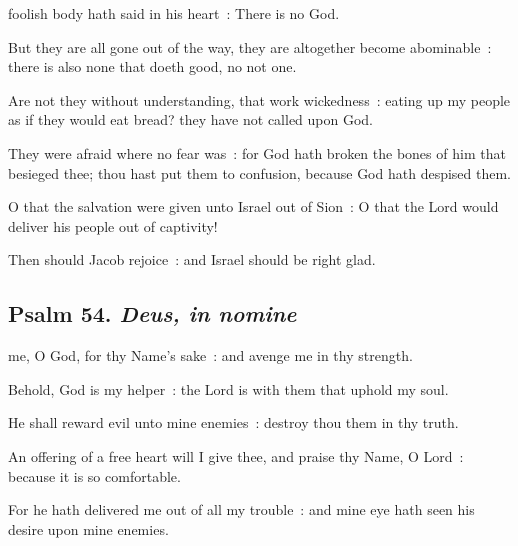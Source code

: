  foolish body hath said in his heart~: There is no God.\par
{}
But they are all gone out of the way, they are altogether become abominable~: there is also none that doeth good, no not one.\par
{}Are not they without understanding, that work wickedness~: eating up my people as if they would eat bread? they have not called upon God.\par
{}They were afraid where no fear was~: for God hath broken the bones of him that besieged thee; thou hast put them to confusion, because God hath despised them.\par
{}O that the salvation were given unto Israel out of Sion~: O that the Lord would deliver his people out of captivity!\par
{}Then should Jacob rejoice~: and Israel should be right glad.\par

\subsection{Psalm 54. \textit{Deus, in nomine}}


 me, O God, for thy Name's sake~: and avenge me in thy strength.\par
{}
Behold, God is my helper~: the Lord is with them that uphold my soul.\par
{}He shall reward evil unto mine enemies~: destroy thou them in thy truth.\par
{}An offering of a free heart will I give thee, and praise thy Name, O Lord~: because it is so comfortable.\par
{}For he hath delivered me out of all my trouble~: and mine eye hath seen his desire upon mine enemies.\par

